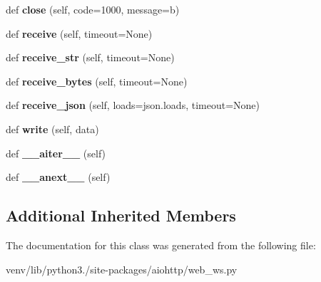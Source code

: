 \begin{DoxyCompactItemize}
def {\bfseries close} (self, code=1000, message=b\textquotesingle{}\textquotesingle{})
\item 
\mbox{\label{classaiohttp_1_1web__ws_1_1_web_socket_response_ac2b4b7671e477c6849ba4b6c279cf302}} 
def {\bfseries receive} (self, timeout=None)
\item 
\mbox{\label{classaiohttp_1_1web__ws_1_1_web_socket_response_ab9ff21925f16b145593b834883dd1d70}} 
def {\bfseries receive\+\_\+str} (self, timeout=None)
\item 
\mbox{\label{classaiohttp_1_1web__ws_1_1_web_socket_response_a4858ecca86f031c26ba2627ece6eb80d}} 
def {\bfseries receive\+\_\+bytes} (self, timeout=None)
\item 
\mbox{\label{classaiohttp_1_1web__ws_1_1_web_socket_response_add6d579bc52a1d8b783d1f831962a895}} 
def {\bfseries receive\+\_\+json} (self, loads=json.\+loads, timeout=None)
\item 
\mbox{\label{classaiohttp_1_1web__ws_1_1_web_socket_response_adb1a68a3265716aad984b8e9ffbf6985}} 
def {\bfseries write} (self, data)
\item 
\mbox{\label{classaiohttp_1_1web__ws_1_1_web_socket_response_a1fa79361ea5630b181b207e3a0cad173}} 
def {\bfseries \+\_\+\+\_\+aiter\+\_\+\+\_\+} (self)
\item 
\mbox{\label{classaiohttp_1_1web__ws_1_1_web_socket_response_a1948aa2bca47cb6dc59b5b7a97f975f1}} 
def {\bfseries \+\_\+\+\_\+anext\+\_\+\+\_\+} (self)
\end{DoxyCompactItemize}
\subsection*{Additional Inherited Members}


The documentation for this class was generated from the following file\+:\begin{DoxyCompactItemize}
\item 
venv/lib/python3./site-\/packages/aiohttp/web\+\_\+ws.\+py\end{DoxyCompactItemize}
